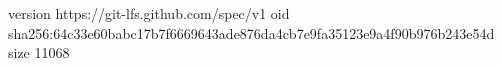 version https://git-lfs.github.com/spec/v1
oid sha256:64c33e60babc17b7f6669643ade876da4cb7e9fa35123e9a4f90b976b243e54d
size 11068

